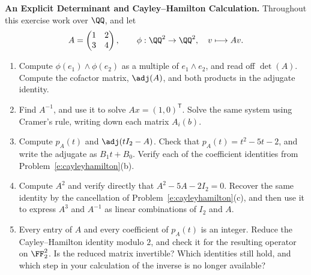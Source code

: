 \documentclass[12pt,reqno]{amsart}
\begin{document}
\hrulefill

\begin{problems}
\item\label{e:example} \textbf{An Explicit Determinant and Cayley--Hamilton Calculation.} Throughout this exercise work over $\QQ$, and let
\[
A=\begin{pmatrix}1&2\\3&4\end{pmatrix},\qquad\phi:\QQ^2\to\QQ^2,\quad v\longmapsto Av.
\]
\begin{enumerate}
\item Compute $\phi(e_1)\wedge\phi(e_2)$ as a multiple of $e_1\wedge e_2$, and read off $\det(A)$. Compute the cofactor matrix, $\adj(A)$, and both products in the adjugate identity.
\item Find $A^{-1}$, and use it to solve $Ax=(1,0)^{\mathsf T}$. Solve the same system using Cramer's rule, writing down each matrix $A_i(b)$.
\item Compute $p_A(t)$ and $\adj(tI_2-A)$. Check that $p_A(t)=t^2-5t-2$, and write the adjugate as $B_1t+B_0$. Verify each of the coefficient identities from Problem~\ref{e:cayleyhamilton}(b).
\item Compute $A^2$ and verify directly that $A^2-5A-2I_2=0$. Recover the same identity by the cancellation of Problem~\ref{e:cayleyhamilton}(c), and then use it to express $A^3$ and $A^{-1}$ as linear combinations of $I_2$ and $A$.
\item Every entry of $A$ and every coefficient of $p_A(t)$ is an integer. Reduce the Cayley--Hamilton identity modulo $2$, and check it for the resulting operator on $\FF_2^2$. Is the reduced matrix invertible? Which identities still hold, and which step in your calculation of the inverse is no longer available?
\end{enumerate}
\end{problems}

\hrulefill
\end{document}
